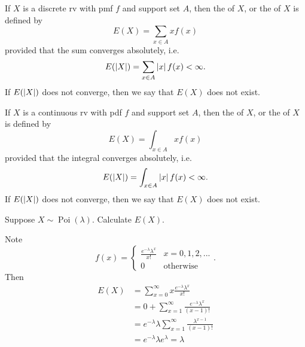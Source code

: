 \documentclass[notoc,notitlepage]{tufte-book}
\DeclareMathOperator{\Poi}{Poi }
\begin{document}
\begin{defn}
\label{defn:expectation_of_a_discrete_rv}
  If $X$ is a discrete rv with pmf $f$ and support set $A$, then the  of $X$, or the  of $X$ is defined by
  \begin{equation}\label{eq:expectation_discrete}
    E(X) = \sum_{x \in A} x f(x)
  \end{equation}
  provided that the sum converges absolutely, i.e.
  \begin{equation*}
    E(\left|X\right|) = \sum_{x \in A} \left|x\right| f(x) < \infty.
  \end{equation*}
  If $E(\left|X\right|)$ does not converge, then we say that $E(X)$ does not exist.
\end{defn}

\begin{defn}
\label{defn:expectation_of_a_continuous_rv}
  If $X$ is a continuous rv with pdf $f$ and support set $A$, then the  of $X$, or the  of $X$ is defined by
  \begin{equation}\label{eq:expectation_discrete}
    E(X) = \int_{x \in A} x f(x)
  \end{equation}
  provided that the integral converges absolutely, i.e.
  \begin{equation*}
    E(\left|X\right|) = \int_{x \in A} \left|x\right| f(x) < \infty.
  \end{equation*}
  If $E(\left|X\right|)$ does not converge, then we say that $E(X)$ does not exist.
\end{defn}

\begin{eg}[Example 2.16]
  Suppose $X \sim \Poi(\lambda)$. Calculate $E(X)$.

  \begin{solution}
    Note
    \begin{equation*}
      f(x) = \begin{cases}
        \frac{e^{- \lambda} \lambda^x}{x!}  & x = 0, 1, 2, ... \\
        0                                   & \text{otherwise}
      \end{cases}.
    \end{equation*}
    Then
    \begin{align*}
      E(X) &= \sum_{x = 0}^{\infty} x \frac{e^{-\lambda} \lambda^x}{x!} \\
           &= 0 + \sum_{x = 1}^{\infty} \frac{e^{-\lambda} \lambda^x}{(x - 1)!} \\
           &= e^{-\lambda} \lambda \sum_{x = 1}^{\infty} \frac{\lambda^{x - 1}}{(x - 1)!} \\
           &= e^{-\lambda} \lambda e^{\lambda} = \lambda
    \end{align*}
  \end{solution}
\end{eg}
\end{document}
